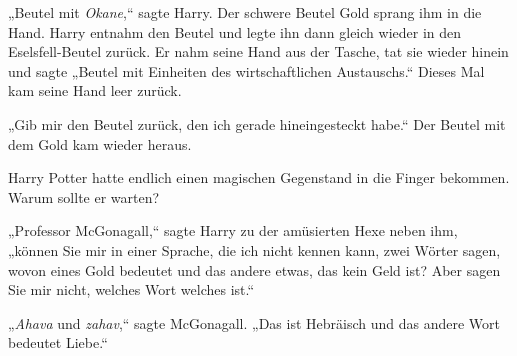 
„Beutel mit \emph{Okane},“ sagte Harry. Der schwere Beutel Gold sprang ihm in die Hand. Harry entnahm den Beutel und legte ihn dann gleich wieder in den Eselsfell-Beutel zurück. Er nahm seine Hand aus der Tasche, tat sie wieder hinein und sagte „Beutel mit Einheiten des wirtschaftlichen Austauschs.“ Dieses Mal kam seine Hand leer zurück.

„Gib mir den Beutel zurück, den ich gerade hineingesteckt habe.“ Der Beutel mit dem Gold kam wieder heraus.

Harry Potter hatte endlich einen magischen Gegenstand in die Finger bekommen. Warum sollte er warten?

„Professor McGonagall,“ sagte Harry zu der amüsierten Hexe neben ihm, „können Sie mir in einer Sprache, die ich nicht kennen kann, zwei Wörter sagen, wovon eines Gold bedeutet und das andere etwas, das kein Geld ist? Aber sagen Sie mir nicht, welches Wort welches ist.“

„\emph{Ahava} und \emph{zahav},“ sagte McGonagall. „Das ist Hebräisch und das andere Wort bedeutet Liebe.“

